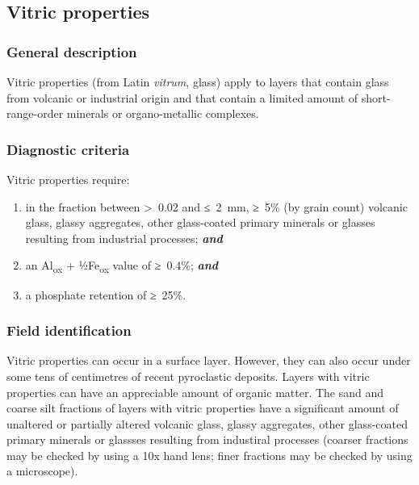 \documentclass[
  letterpaper,
  DIV=11,
  numbers=noendperiod]{scrreprt}
\providecommand{\tightlist}{%
  \setlength{\itemsep}{0pt}\setlength{\parskip}{0pt}}\usepackage{longtable,booktabs,array}
\begin{document}
\hypertarget{vitric-properties}{%
\subsection{Vitric properties}\label{vitric-properties}}

\hypertarget{general-description-53}{%
\subsubsection{General description}\label{general-description-53}}

Vitric properties (from Latin \emph{vitrum}, glass) apply to layers that
contain glass from volcanic or industrial origin and that contain a
limited amount of short-range-order minerals or organo-metallic
complexes.

\hypertarget{diagnostic-criteria-55}{%
\subsubsection{Diagnostic criteria}\label{diagnostic-criteria-55}}

Vitric properties require:

\begin{enumerate}
\def\labelenumi{\arabic{enumi}.}
\tightlist
\item
  in the fraction between \textgreater~0.02 and ≤~2~mm, ≥~5\% (by grain
  count) volcanic glass, glassy aggregates, other glass-coated primary
  minerals or glasses resulting from industrial processes;
  \textbf{\emph{and}}
\item
  an Al\textsubscript{ox} + ½Fe\textsubscript{ox} value of ≥~0.4\%;
  \textbf{\emph{and}}
\item
  a phosphate retention of ≥~25\%.
\end{enumerate}

\hypertarget{field-identification-39}{%
\subsubsection{Field identification}\label{field-identification-39}}

Vitric properties can occur in a surface layer. However, they can also
occur under some tens of centimetres of recent pyroclastic deposits.
Layers with vitric properties can have an appreciable amount of organic
matter. The sand and coarse silt fractions of layers with vitric
properties have a significant amount of unaltered or partially altered
volcanic glass, glassy aggregates, other glass-coated primary minerals
or glassses resulting from industiral processes (coarser fractions may
be checked by using a 10x hand lens; finer fractions may be checked by
using a microscope).
\end{document}
